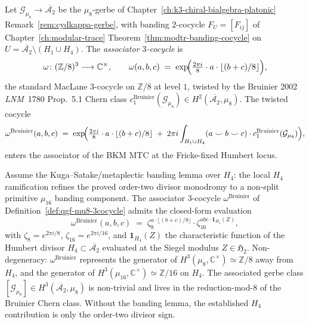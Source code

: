 \begin{definition}
\label{def:qgf-mu8-3cocycle}
Let $\mathcal G_{\mu_8}\to\overline{\mathcal A_2}$ be the $\mu_8$-gerbe
of Chapter~\ref{ch:k3-chiral-bialgebra-platonic}
Remark~\ref{rem:cydkappa-gerbe}, with banding $2$-cocycle
$F_U = [F_{ij}]$ of
Chapter~\ref{ch:modular-trace}
Theorem~\ref{thm:modtr-banding-cocycle} on
$U = \overline{\mathcal A_2}\setminus(H_1\cup H_4)$. The
\emph{associator $3$-cocycle} is
\[
 \omega\colon (\mathbb Z/8)^3 \longrightarrow \mathbb C^\times,
 \qquad
 \omega(a, b, c) \;=\; \exp\!\Bigl(
 \tfrac{2\pi i}{8}\cdot a\cdot\lfloor(b+c)/8\rfloor
 \Bigr),
\]
the standard MacLane $3$-cocycle on $\mathbb Z/8$ at level $1$, twisted
by the Bruinier 2002 \emph{LNM}~1780 Prop.~5.1 Chern class
$c_1^{\mathrm{Bruinier}}(\mathcal G_{\mu_8})
\in H^2(\overline{\mathcal A_2}, \mu_8)$. The twisted cocycle
\[
 \omega^{\mathrm{Bruinier}}(a, b, c)
 \;=\;
 \exp\!\Bigl(
 \tfrac{2\pi i}{8}\cdot a\cdot\lfloor(b+c)/8\rfloor
 \;+\;
 2\pi i\int_{H_1\cup H_4}
 (a\smile b\smile c)\cdot c_1^{\mathrm{Bruinier}}(\mathcal G_{\mu_8})
 \Bigr),
\]
enters the associator of the BKM MTC at the Fricke-fixed Humbert locus.
\end{definition}

\begin{theorem}
\label{thm:qgf-omega-closed-form}
Assume the Kuga--Satake/metaplectic banding lemma over $H_4$: the local
$H_4$ ramification refines the proved order-two divisor monodromy to a
non-split primitive $\mu_{16}$ banding component.
The associator $3$-cocycle $\omega^{\mathrm{Bruinier}}$ of
Definition~\ref{def:qgf-mu8-3cocycle} admits the closed-form evaluation
\[
 \boxed{\;
 \omega^{\mathrm{Bruinier}}(a, b, c)
 \;=\;
 \zeta_8^{a\cdot\lfloor(b+c)/8\rfloor}
 \cdot
 \zeta_{16}^{a b c\cdot\mathbf 1_{H_4}(Z)},\;}
\]
with $\zeta_8 = e^{2\pi i/8}$, $\zeta_{16} = e^{2\pi i/16}$, and
$\mathbf 1_{H_4}(Z)$ the characteristic function of the Humbert divisor
$H_4\subset\overline{\mathcal A_2}$ evaluated at the Siegel modulus
$Z\in\mathfrak H_2$. Non-degeneracy: $\omega^{\mathrm{Bruinier}}$
represents the generator of $H^3(\mu_8, \mathbb C^\times) \simeq
\mathbb Z/8$ away from $H_4$, and the generator of
$H^3(\mu_{16}, \mathbb C^\times) \simeq \mathbb Z/16$ on $H_4$. The
associated gerbe class $[\mathcal G_{\mu_8}]\in H^3(\overline
{\mathcal A_2}, \mu_8)$ is non-trivial and lives in the reduction-mod-$8$
of the Bruinier Chern class.
Without the banding lemma, the established $H_4$ contribution is only
the order-two divisor sign.
\end{theorem}

